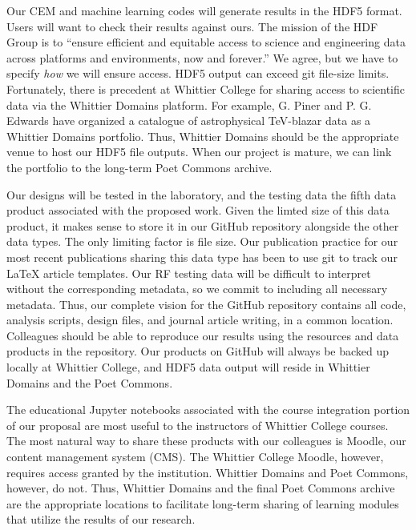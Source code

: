 \documentclass[11pt]{amsart}
\begin{document}
Our CEM and machine learning codes will generate results in the HDF5 format.  Users will want to check their results against ours.  The mission of the HDF Group is to ``ensure efficient and equitable access to science and engineering data across platforms and environments, now and forever.''  We agree, but we have to specify \textit{how} we will ensure access.  HDF5 output can exceed git file-size limits.  Fortunately, there is precedent at Whittier College for sharing access to scientific data via the Whittier Domains platform.  For example, G. Piner and P. G. Edwards have organized a catalogue of astrophysical TeV-blazar data as a Whittier Domains portfolio.  Thus, Whittier Domains should be the appropriate venue to host our HDF5 file outputs.  When our project is mature, we can link the portfolio to the long-term Poet Commons archive.  

Our designs will be tested in the laboratory, and the testing data the fifth data product associated with the proposed work.  Given the limted size of this data product, it makes sense to store it in our GitHub repository alongside the other data types.  The only limiting factor is file size.  Our publication practice for our most recent publications sharing this data type has been to use git to track our LaTeX article templates.  Our RF testing data will be difficult to interpret without the corresponding metadata, so we commit to including all necessary metadata.  Thus, our complete vision for the GitHub repository contains all code, analysis scripts, design files, and journal article writing, in a common location.  Colleagues should be able to reproduce our results using the resources and data products in the repository.  Our products on GitHub will always be backed up locally at Whittier College, and HDF5 data output will reside in Whittier Domains and the Poet Commons.  

The educational Jupyter notebooks associated with the course integration portion of our proposal are most useful to the instructors of Whittier College courses.  The most natural way to share these products with our colleagues is Moodle, our content management system (CMS).  The Whittier College Moodle, however, requires access granted by the institution.  Whittier Domains and Poet Commons, however, do not.  Thus, Whittier Domains and the final Poet Commons archive are the appropriate locations to facilitate long-term sharing of learning modules that utilize the results of our research. 
\end{document}
